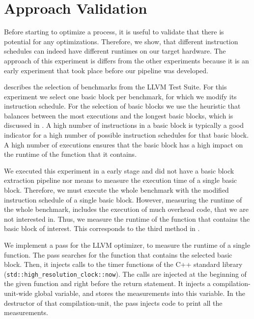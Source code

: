 \section{Approach Validation}
\label{sec:eval:validation}
Before starting to optimize a process, it is useful to validate that there is potential for any optimizations.
Therefore, we show, that different instruction schedules can indeed have different runtimes on our target hardware.
The approach of this experiment is differs from the other experiments because it is an early experiment that took place before our pipeline was developed.

 describes the selection of benchmarks from the LLVM Test Suite.
For this experiment we select one basic block per benchmark, for which we modify its instruction schedule.
For the selection of basic blocks we use the heuristic that balances between the most executions and the longest basic blocks, which is discussed in .
A high number of instructions in a basic block is typically a good indicator for a high number of possible instruction schedules for that basic block. 
A high number of executions ensures that the basic block has a high impact on the runtime of the function that it contains.

We executed this experiment in a early stage and did not have a basic block extraction pipeline nor means to measure the execution time of a single basic block.
Therefore, we must execute the whole benchmark with the modified instruction schedule of a single basic block.
However, measuring the runtime of the whole benchmark, includes the execution of much overhead code, that we are not interested in.
Thus, we measure the runtime of the function that contains the basic block of interest.
This corresponds to the third method in .

We implement a pass for the LLVM optimizer, to measure the runtime of a single function.
The pass searches for the function that contains the selected basic block.
Then, it injects calls to the timer functions of the C++ standard library (\lstinline|std::high_resolution_clock::now|).
The calls are injected at the beginning of the given function and right before the return statement.
It injects a compilation-unit-wide global variable, and stores the measurements into this variable.
In the destructor of that compilation-unit, the pass injects code to print all the measurements.

